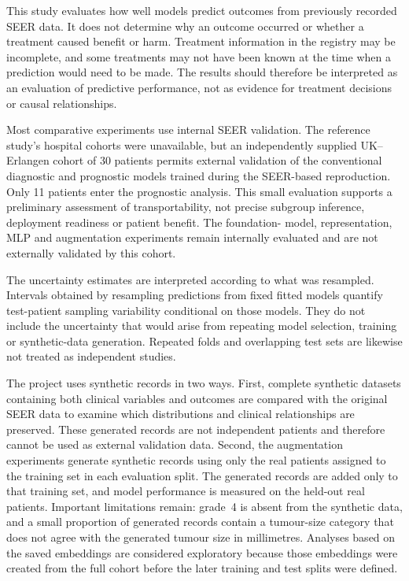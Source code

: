 This study evaluates how well models predict outcomes from previously recorded
SEER data. It does not determine why an outcome occurred or whether a treatment
caused benefit or harm. Treatment information in the registry may be incomplete,
and some treatments may not have been known at the time when a prediction would
need to be made. The results should therefore be interpreted as an evaluation of
predictive performance, not as evidence for treatment decisions or causal
relationships.

Most comparative experiments use internal SEER validation. The reference study's
hospital cohorts were unavailable, but an independently supplied UK--Erlangen
cohort of 30 patients permits external validation of the conventional diagnostic
and prognostic models trained during the SEER-based reproduction. Only 11
patients enter the prognostic analysis. This small
evaluation supports a preliminary assessment of transportability, not precise
subgroup inference, deployment readiness or patient benefit. The foundation-
model, representation, MLP and augmentation experiments remain internally
evaluated and are not externally validated by this cohort.

The uncertainty estimates are interpreted according to what was resampled.
Intervals obtained by resampling predictions from fixed fitted models quantify
test-patient sampling variability conditional on those models. They do not
include the uncertainty that would arise from repeating model selection,
training or synthetic-data generation. Repeated folds and overlapping test sets
are likewise not treated as independent studies.

The project uses synthetic records in two ways. First, complete synthetic
datasets containing both clinical variables and outcomes are compared with the
original SEER data to examine which distributions and clinical relationships are
preserved. These generated records are not independent patients and therefore
cannot be used as external validation data. Second, the augmentation experiments
generate synthetic records using only the real patients assigned to the training
set in each evaluation split. The generated records are added only to that
training set, and model performance is measured on the held-out real patients.
Important limitations remain: grade~4 is absent from the synthetic data, and a
small proportion of generated records contain a tumour-size category that does
not agree with the generated tumour size in millimetres. Analyses based on the
saved embeddings are considered exploratory because those embeddings were
created from the full cohort before the later training and test splits were
defined.

